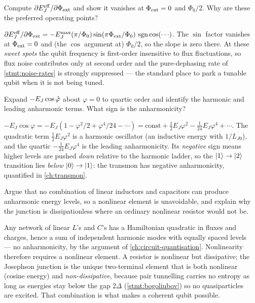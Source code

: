 \begin{exercise}
Compute $\partial E_J^{\rm eff}/\partial\Phi_{\rm ext}$ and show it
vanishes at $\Phi_{\rm ext}=0$ and $\Phi_0/2$. Why are these the
preferred operating points?
\begin{solution}
$\partial E_J^{\rm eff}/\partial\Phi_{\rm ext}
=-E_J^{\rm max}(\pi/\Phi_0)\sin(\pi\Phi_{\rm ext}/\Phi_0)\,
\operatorname{sgn}\cos(\cdots)$. The $\sin$ factor vanishes at
$\Phi_{\rm ext}=0$ and (the $\cos$ argument at) $\Phi_0/2$, so the
slope is zero there. At these \emph{sweet spots} the qubit frequency is
first-order insensitive to flux fluctuations, so flux noise contributes
only at second order and the pure-dephasing rate of
\cref{stmt:noise-rates} is strongly suppressed --- the standard place
to park a tunable qubit when it is not being tuned.
\end{solution}
\end{exercise}

\begin{exercise}
Expand $-E_J\cos\hat{\varphi}$ about $\varphi=0$ to quartic order and
identify the harmonic and leading anharmonic terms. What sign is the
anharmonicity?
\begin{solution}
$-E_J\cos\varphi=-E_J(1-\varphi^2/2+\varphi^4/24-\cdots)
=\text{const}+\tfrac12 E_J\varphi^2-\tfrac{1}{24}E_J\varphi^4+\cdots$.
The quadratic term $\tfrac12 E_J\varphi^2$ is a harmonic oscillator
(an inductive energy with $1/L_{J0}$), and the quartic
$-\tfrac{1}{24}E_J\varphi^4$ is the leading anharmonicity. Its
\emph{negative} sign means higher levels are pushed \emph{down}
relative to the harmonic ladder, so the $\ket1\to\ket2$ transition lies
\emph{below} $\ket0\to\ket1$: the transmon has negative anharmonicity,
quantified in \cref{ch:transmon}.
\end{solution}
\end{exercise}

\begin{exercise}
Argue that no combination of linear inductors and capacitors can
produce anharmonic energy levels, so a nonlinear element is
unavoidable, and explain why the junction is dissipationless where an
ordinary nonlinear resistor would not be.
\begin{solution}
Any network of linear $L$'s and $C$'s has a Hamiltonian quadratic in
fluxes and charges, hence a sum of independent harmonic modes with
equally spaced levels --- no anharmonicity, by the argument of
\cref{ch:circuit-quantisation}. Nonlinearity therefore requires a
nonlinear element. A resistor is nonlinear but dissipative; the
Josephson junction is the unique two-terminal element that is both
nonlinear (cosine energy) and \emph{non-dissipative}, because pair
tunnelling carries no entropy as long as energies stay below the gap
$2\Delta$ (\cref{stmt:bogoliubov}) so no quasiparticles are excited.
That combination is what makes a coherent qubit possible.
\end{solution}
\end{exercise}
